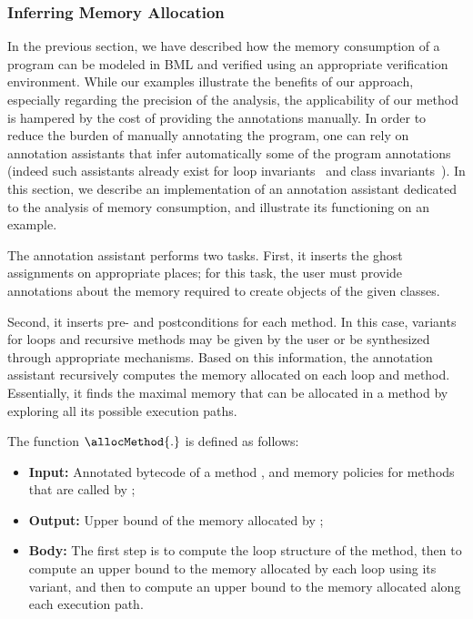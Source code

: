 \subsubsection{Inferring Memory Allocation}\label{sec:infer}
In the previous section, we have described how the memory consumption
of a program can be modeled in BML and verified using an appropriate
verification environment. While our examples illustrate the benefits
of our approach, especially regarding the precision of the analysis,
the applicability of our method is hampered by the cost of providing
the annotations manually. In order to reduce the burden of manually
annotating the program, one can rely on annotation assistants that
infer automatically some of the program annotations (indeed such
assistants already exist for loop invariants~\cite{NimmerE02:ISSTA} and class
invariants~\cite{log04:vmcai}). In this section, we describe an
implementation of an annotation assistant dedicated to the analysis of
memory consumption, and illustrate its functioning on an example.
 
The annotation assistant performs two tasks. First, it inserts the
ghost assignments on appropriate places; for this task, the user must
provide annotations about the memory required to create objects of the
given classes. 

Second, it inserts pre- and postconditions for each method. In this case, variants for loops and recursive methods may be given by the user or be
synthesized through appropriate mechanisms.  Based on this
information, the annotation assistant recursively computes the memory
allocated on each loop and method. Essentially, it finds the maximal
memory that can be allocated in a method by exploring all its possible
execution paths.

The function $\allocMethod{.}$ is defined as follows:
\begin{itemize}
\item \textbf{Input:} Annotated bytecode of a method \method, and memory
policies for methods that are called by \method;

\item \textbf{Output:} Upper bound of the memory allocated by \method;

\item \textbf{Body:} The first step is to compute the loop structure
of the method, then to compute an upper bound to the memory allocated
by each loop using its variant, and then to compute an upper bound to
the memory allocated along each execution path.
\end{itemize}




